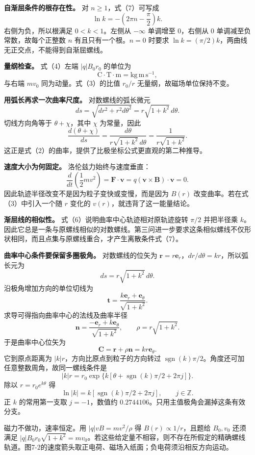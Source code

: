 \documentclass[12pt,a4paper,UTF8]{ctexart}
\begin{document}
\textbf{自渐屈条件的根存在性。} 对 \(n\ge1\)，式（7）可写成 \[
\ln k=-\left(2\pi n-\frac\pi2\right)k.
\] 右侧为负，所以根满足 \(0<k<1\)。左侧从 \(-\infty\) 单调增至
\(0\)，右侧从 \(0\) 单调减至负常数，故每个正整数 \(n\)
有且只有一个根。\(n=0\) 时要求
\(\ln k=(\pi/2)k\)，两曲线无正交点，不能得到自渐屈螺线。

\textbf{量纲检查。} 式（4）左端 \(|q|B_0r_0\) 的单位为 \[
\mathrm C\cdot\mathrm T\cdot\mathrm m
=\mathrm{kg\,m\,s^{-1}},
\] 与右端 \(mv_0\) 同为动量。式（3）的比值 \(r_0/r\)
无量纲，故磁场单位保持不变。

\textbf{用弧长再求一次曲率尺度。} 对数螺线的弧长微元 \[
ds=\sqrt{dr^2+r^2d\theta^2}
=r\sqrt{1+k^2}\,d\theta.
\] 切线方向角等于 \(\theta+\chi\)，其中 \(\chi\) 为常量，因此 \[
\frac{d(\theta+\chi)}{ds}
=\frac{d\theta}{r\sqrt{1+k^2}\,d\theta}
=\frac1{r\sqrt{1+k^2}}.
\] 这正是式（2）的曲率，提供了比极坐标公式更直观的第二种推导。

\textbf{速度大小为何固定。} 洛伦兹力始终与速度垂直： \[
\frac{d}{dt}\left(\frac12mv^2\right)
=\bm F\cdot\bm v
=q(\bm v\times\bm B)\cdot\bm v=0.
\] 因此轨迹半径改变不是因为粒子变快或变慢，而是因为 \(B(r)\)
改变曲率。若在式（3）中引入一个随 \(r\) 变化的
\(v(r)\)，就违背了这一能量结论。

\textbf{渐屈线的相似性。} 式（6）说明曲率中心轨迹相对原轨迹旋转
\(\pi/2\) 并把半径乘
\(k\)。因此它总是一条与原螺线相似的对数螺线。第三问进一步要求这条相似螺线不仅形状相同，而且点集与原螺线重合，才产生离散条件式（7）。

\textbf{曲率中心条件要保留多圈极角。} 对数螺线的位矢为
\(\bm r=r\bm e_r\)，\(dr/d\theta=kr\)，所以弧长元为 \[
ds=r\sqrt{1+k^2}\,d\theta.
\] 沿极角增加方向的单位切线为 \[
\bm t=\frac{k\bm e_r+\bm e_\theta}{\sqrt{1+k^2}}.
\] 求导可得指向曲率中心的法线及曲率半径 \[
\bm n=\frac{-\bm e_r+k\bm e_\theta}{\sqrt{1+k^2}},\qquad
\rho=r\sqrt{1+k^2}.
\] 于是曲率中心位矢为 \[
\bm C=\bm r+\rho\bm n=kr\bm e_\theta.
\] 它到原点距离为 \(|k|r\)，方向比原点到粒子的方向转过
\(\operatorname{sgn}(k)\pi/2\)。角度还可加任意整数周角，故同一螺线条件是
\[
|k|r=r_0\exp\{k[\theta+\operatorname{sgn}(k)\pi/2+2\pi j]\}.
\] 除以 \(r=r_0e^{k\theta}\) 得 \[
\ln|k|=k[\operatorname{sgn}(k)\pi/2+2\pi j],\qquad j\in\mathbb Z.
\] 正 \(k\) 的常用第一支取 \(j=-1\)，数值约
\(0.2744106\)。只用主值极角会漏掉这条有效分支。

磁力不做功，速率恒定。用 \(|q|vB=mv^2/\rho\) 得
\(B(r)\propto1/r\)，且题给 \(B_0,v_0\) 还须满足
\(|q|B_0r_0\sqrt{1+k^2}=mv_0\)。若这些给定量不相容，则不存在所假定的精确螺线轨道。图7-2的速度箭头取正电荷、磁场入纸面；负电荷须沿相反方向运动。
\end{document}

